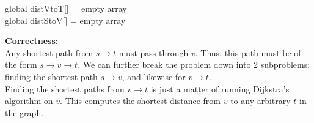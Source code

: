 \documentclass{exam}
\begin{document}
\begin{questions}
\leavevmode\newline
\leavevmode\newline
\leavevmode\newline
\leavevmode\newline
\leavevmode\newline
\begin{algorithm}
	\DontPrintSemicolon
	global distVtoT[] = empty array\\
	global distStoV[] = empty array\\
	\leavevmode\newline
	\leavevmode\newline
	\leavevmode\newline
\end{algorithm}

\leavevmode\newline
{\bf Correctness:}\\
Any shortest path from $s \rightarrow t$ must pass through $v$. Thus, this path must be of the form $s \rightarrow v \rightarrow t$. We can further break the problem down into 2 subproblems: finding the shortest path $s \rightarrow v$, and likewise for $v \rightarrow t$.\\

Finding the shortest paths from $v \rightarrow t$ is just a matter of running Dijkstra's algorithm on $v$. This computes the shortest distance from $v$ to any arbitrary $t$ in the graph.\\


\end{questions}
\end{document}
